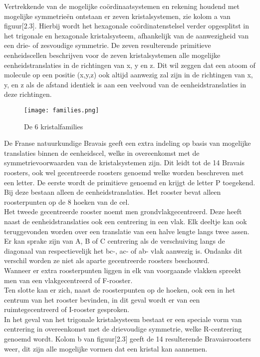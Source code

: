 \par 
Vertrekkende van de mogelijke coördinaatsystemen en rekening houdend met mogelijke symmetrieën ontstaan er zeven kristalsystemen, zie kolom a van figuur[2.3]. Hierbij wordt het hexagonale coördinatenstelsel verder opgesplitst in het trigonale en hexagonale kristalsysteem, afhankelijk van de aanwezigheid van een drie- of zesvoudige symmetrie. De zeven resulterende primitieve eenheidscellen beschrijven  voor de zeven kristalsystemen alle mogelijke eenheidstranslaties in de richtingen van x, y en z. Dit wil zeggen dat een atoom of molecule op een positie (x,y,z) ook altijd aanwezig zal zijn in de richtingen van x, y, en z als de afstand identiek is aan een veelvoud van de eenheidstranslaties in deze richtingen.

\begin{figure}[H]
\texttt{[image: families.png]}
\caption{De 6 kristalfamilies}
\end{figure}

\par   
De Franse natuurkundige Bravais \citep*{BRAV} geeft een extra indeling op basis van mogelijke translaties binnen de eenheidscel, welke in overeenkomst met de symmetrievoorwaarden van de kristalsystemen zijn. Dit leidt tot de 14 Bravais roosters, ook wel gecentreerde roosters genoemd welke worden beschreven met een letter. 
De eerste wordt de primitieve genoemd en krijgt de letter P toegekend. Bij deze bestaan alleen de eenheidstranslaties. Het rooster bevat alleen roosterpunten op de 8 hoeken van de cel.
\\
Het tweede gecentreerde rooster noemt men grondvlakgecentreerd. Deze heeft naast de eenheidstranslaties ook een centrering in een vlak. Elk deeltje kan ook teruggevonden worden over een translatie van een halve lengte langs twee assen. Er kan sprake zijn van A, B of C centrering als de verschuiving langs de diagonaal van respectievelijk het bc-, ac- of ab- vlak aanwezig is. Ondanks dit verschil worden ze niet als aparte gecentreerde roosters beschouwd.   
\\
Wanneer er extra roosterpunten liggen in elk van voorgaande vlakken spreekt men van een vlakgecentreerd of F-rooster. 
\\
Ten slotte kan er zich, naast de roosterpunten op de hoeken, ook een in het centrum van het rooster bevinden, in dit geval wordt er van een ruimtegecentreerd of I-rooster gesproken. 
\\
In het geval van het trigonale kristalsysteem bestaat er een speciale vorm van centrering in overeenkomst met de drievoudige symmetrie, welke R-centrering genoemd wordt. Kolom b van figuur[2.3] geeft de 14 resulterende Bravaisroosters weer, dit zijn alle mogelijke vormen dat een kristal kan aannemen.
 
